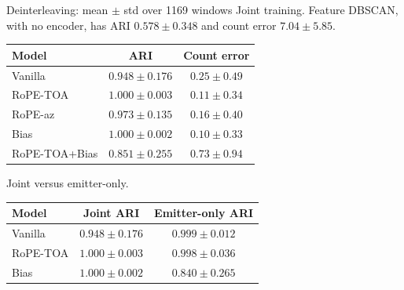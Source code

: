 \documentclass[aspectratio=169,10pt]{beamer}
\begin{document}
\begin{frame}{Deinterleaving: mean \(\pm\) std over 1169 windows}
  {\small Joint training. Feature DBSCAN, with no encoder, has ARI \(0.578\pm0.348\) and count error \(7.04\pm5.85\).}
  \vspace{0.45em}
  \centering
  {\small
  \begin{tabular}{@{}lcc@{}}
    \toprule
    Model & ARI & Count error \\
    \midrule
    Vanilla       & \(0.948\pm0.176\) & \(0.25\pm0.49\) \\
    RoPE-TOA      & \(\mathbf{1.000\pm0.003}\) & \(0.11\pm0.34\) \\
    RoPE-az       & \(0.973\pm0.135\) & \(0.16\pm0.40\) \\
    Bias          & \(\mathbf{1.000\pm0.002}\) & \(\mathbf{0.10\pm0.33}\) \\
    RoPE-TOA+Bias & \(0.851\pm0.255\) & \(0.73\pm0.94\) \\
    \bottomrule
  \end{tabular}}

  \vspace{0.8em}
  {\small Joint versus emitter-only.}
  \vspace{0.35em}
  \centering
  {\small
  \begin{tabular}{@{}lcc@{}}
    \toprule
    Model & Joint ARI & Emitter-only ARI \\
    \midrule
    Vanilla  & \(0.948\pm0.176\) & \(0.999\pm0.012\) \\
    RoPE-TOA & \(1.000\pm0.003\) & \(0.998\pm0.036\) \\
    Bias     & \(1.000\pm0.002\) & \(0.840\pm0.265\) \\
    \bottomrule
  \end{tabular}}
\end{frame}
\end{document}
